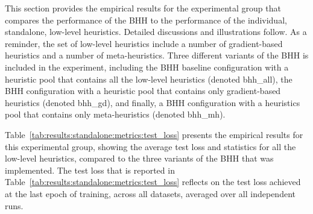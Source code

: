 This section provides the empirical results for the experimental group that compares the performance of the \acs{BHH} to the performance of the individual, standalone, low-level heuristics. Detailed discussions and illustrations follow. As a reminder, the set of low-level heuristics include a number of gradient-based heuristics and a number of meta-heuristics. Three different variants of the \acs{BHH} is included in the experiment, including the \acs{BHH} baseline configuration with a heuristic pool that contains all the low-level heuristics (denoted bhh\_all), the \acs{BHH} configuration with a heuristic pool that contains only gradient-based heuristics (denoted bhh\_gd), and finally, a \acs{BHH} configuration with a heuristics pool that contains only meta-heuristics (denoted bhh\_mh).

Table~\ref{tab:results:standalone:metrics:test_loss} presents the empirical results for this experimental group, showing the average test loss and statistics for all the low-level heuristics, compared to the three variants of the \acs{BHH} that was implemented. The test loss that is reported in Table~\ref{tab:results:standalone:metrics:test_loss} reflects on the test loss achieved at the last epoch of training, across all datasets, averaged over all independent runs.

